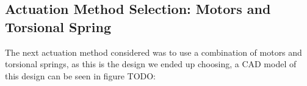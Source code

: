 \subsection{Actuation Method Selection: Motors and Torsional Spring}

The next actuation method considered was to use a combination of motors and torsional springs, as this is the design we ended up choosing, a CAD model of this design can be seen in figure TODO: 

\subsection{}